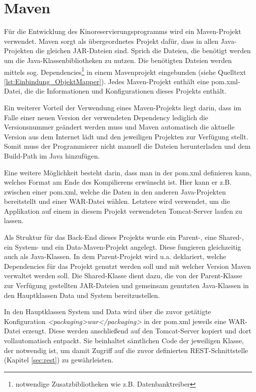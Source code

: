 \section{Maven}
\label{sec:maven}
Für die Entwicklung des Kinoreservierungsprogramms wird ein Maven-Projekt verwendet.
Maven sorgt als übergeordnetes Projekt dafür, dass in allen Java-Projekten die gleichen JAR-Dateien sind.
Sprich die Dateien, die benötigt werden um die Java-Klassenbibliotheken zu nutzen.
Die benötigten Dateien werden mittels sog. Dependencies\footnote{notwendige Zusatzbibliotheken wie z.B. Datenbanktreiber} in einem Mavenprojekt eingebunden (siehe Quelltext \vref{lst:Einbindung_ObjektMapper}).
Jedes Maven-Projekt enthält eine pom.xml-Datei, die die Informationen und Konfigurationen dieses Projekts enthält.

Ein weiterer Vorteil der Verwendung eines Maven-Projekts liegt darin, dass im Falle einer neuen Version der verwendeten Dependency lediglich die Versionsnummer geändert werden muss und Maven automatisch die aktuelle Version aus dem Internet lädt und den jeweiligen Projekten zur Verfügung stellt.
Somit muss der Programmierer nicht manuell die Dateien herunterladen und dem Build-Path im Java hinzufügen.

Eine weitere Möglichkeit besteht darin, dass man in der pom.xml definieren kann, welches Format am Ende des Kompilierens erwünscht ist.
Hier kann er z.B. zwischen einer pom.xml, welche die Daten in den anderen Java-Projekten bereitstellt und einer WAR-Datei wählen.
Letztere wird verwendet, um die Applikation auf einem in diesem Projekt verwendeten Tomcat-Server laufen zu lassen.

Als Struktur für das Back-End dieses Projekts wurde ein Parent-, eine Shared-, ein System- und ein Data-Maven-Projekt angelegt.
Diese fungieren gleichzeitig auch als Java-Klassen.
In dem Parent-Projekt wird u.a. deklariert, welche Dependencies für das Projekt genutzt werden soll und mit welcher Version Maven verwaltet werden soll.
Die Shared-Klasse dient dazu, die von der Parent-Klasse zur Verfügung gestellten JAR-Dateien und gemeinsam genutzten Java-Klassen in den Hauptklassen Data und System bereitzustellen.

In den Hauptklassen System und Data wird über die zuvor getätigte Konfiguration \emph{<packaging>war</packaging>} in der pom.xml jeweils eine WAR-Datei erzeugt.
Diese werden anschließend auf den Tomcat-Server kopiert und dort vollautomatisch entpackt.
Sie beinhaltet sämtlichen Code der jeweiligen Klasse, der notwendig ist, um damit Zugriff auf die zuvor definierten \acs{REST}-Schnittstelle (Kapitel \vref{sec:rest}) zu gewährleisten.